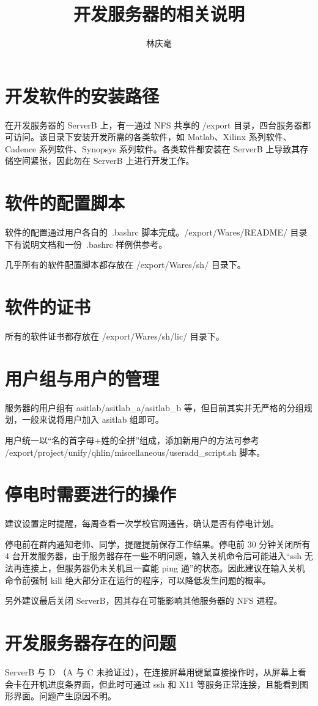 \documentclass{article}
\begin{document}
\author{林庆毫}
\title{开发服务器的相关说明}
\maketitle
\tableofcontents
\newpage
{}

\section{开发软件的安装路径}
在开发服务器的 ServerB 上，有一通过 NFS 共享的 /export 目录，四台服务器都可访问。该目录下安装开发所需的各类软件，如 Matlab、Xilinx 系列软件、Cadence 系列软件、Synopsys 系列软件。各类软件都安装在 ServerB 上导致其存储空间紧张，因此勿在 ServerB 上进行开发工作。

\section{软件的配置脚本}
软件的配置通过用户各自的\ .bashrc 脚本完成。/export/Wares/README/ 目录下有说明文档和一份\ .bashrc 样例供参考。

几乎所有的软件配置脚本都存放在 /export/Wares/sh/ 目录下。

\section{软件的证书}
所有的软件证书都存放在 /export/Wares/sh/lic/ 目录下。

\section{用户组与用户的管理}
服务器的用户组有 asitlab/asitlab\_a/asitlab\_b 等，但目前其实并无严格的分组规划，一般来说将用户加入 asitlab 组即可。

用户统一以“名的首字母+姓的全拼”组成，添加新用户的方法可参考 /export/project/unify/qhlin/miscellaneous/useradd\_script.sh 脚本。

\section{停电时需要进行的操作}
建议设置定时提醒，每周查看一次学校官网通告，确认是否有停电计划。

停电前在群内通知老师、同学，提醒提前保存工作结果。停电前 30 分钟关闭所有 4 台开发服务器，由于服务器存在一些不明问题，输入关机命令后可能进入“ssh 无法再连接上，但服务器仍未关机且一直能 ping 通”的状态。因此建议在输入关机命令前强制 kill 绝大部分正在运行的程序，可以降低发生问题的概率。

另外建议最后关闭 ServerB，因其存在可能影响其他服务器的 NFS 进程。

\section{开发服务器存在的问题}
ServerB 与 D （A 与 C 未验证过），在连接屏幕用键鼠直接操作时，从屏幕上看会卡在开机进度条界面，但此时可通过 ssh 和 X11 等服务正常连接，且能看到图形界面。问题产生原因不明。
\end{document}
